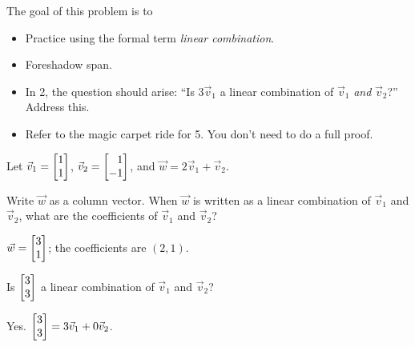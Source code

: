 \documentclass{workbook}
\begin{document}
\begin{slide}


	\question
	\label{ProbSkewBasis}
	\begin{annotation}
		\begin{goals}

			The goal of this problem is to
			\begin{itemize}
				\item Practice using the formal term \emph{linear combination}.
				\item Foreshadow span.
			\end{itemize}
		\end{goals}

		\begin{notes}
			\begin{itemize}
				\item In 2, the question should arise: ``Is $3\vec v_1$
					a linear combination of $\vec v_1$ \emph{and}
					$\vec v_2$?'' Address this.
				\item Refer to the magic carpet ride for 5. You don't
					need to do a full proof.
			\end{itemize}
		\end{notes}
	\end{annotation}
	Let $\vec v_1=\mat{1\\1}$, $\vec v_2=\mat{1\\-1}$, and $\vec w=2\vec v_1+\vec v_2$.
	\begin{parts}
		\item Write $\vec w$ as a column vector. When $\vec w$ is written as a
			linear combination of $\vec v_1$ and $\vec v_2$, what are the
			coefficients of $\vec v_1$ and $\vec v_2$?
			\begin{solution}
				$\vec w=\mat{3\\1}$; the coefficients are $(2,1)$.
			\end{solution}
		\item Is $\mat{3\\3}$ a linear combination of $\vec v_1$ and $\vec v_2$?
			\begin{solution}[inline]
				Yes. $\mat{3\\3}=3\vec v_1+0\vec v_2$.
			\end{solution}


\end{parts}
\end{slide}
\end{document}
